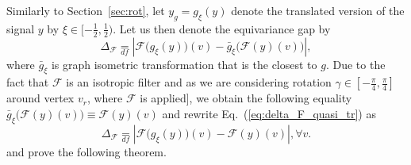 \documentclass[10pt,journal,compsoc]{IEEEtran}
\newcommand{\renata}[1]{\textcolor{black}{#1}}
\newcommand{\df}{\mathop{=}\limits_{df}}
\newcommand{\mF}{\mathcal{F}}
\begin{document}
	  
	 Similarly to Section~\ref{sec:rot}, let $y_g = g_\xi(y)$ denote the translated version of the signal $y$ by $\xi \in [-\frac{1}{2},\frac{1}{2})$. Let us then denote the equivariance gap by 
	 \begin{equation}
	 \Delta_\mathcal{F} \df \left| \mathcal{F}\big(g_{\xi} (y)\big)(v) - \bar{g}_{\xi}\big(\mathcal{F}(y)(v)\big) \right| ,
	 \label{eq:delta_F_quasi_tr}
	 \end{equation}
	 where $\bar{g}_{\xi}$ is graph isometric transformation that is the closest to $g$. Due to the fact that $\mF$ is an isotropic filter and as we are considering rotation $\gamma \in [-\frac{\pi}{4}, \frac{\pi}{4}]$ around vertex $v_r$, where $\mF$ is applied], we obtain the following equality $\bar{g}_{\xi}\big(\mF(y)(v)\big) \equiv \mF(y)(v)$ and rewrite Eq.~(\ref{eq:delta_F_quasi_tr}) as
	 \begin{equation}
	 \Delta_\mathcal{F} \df \left| \mathcal{F}\big(g_{\xi} (y)\big)(v) - \mathcal{F}(y)(v) \right|, \forall v.
	 \label{eq:equivariance_ref_trans_notations_smpl}
	 \end{equation} 
	\noindent
	and prove the following theorem.
	
	
	
\end{document}
